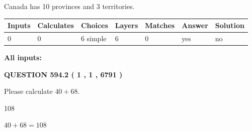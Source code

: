 \documentclass[12pt]{article}
\begin{document}
 
Canada has 10  provinces and 3 territories.
 
 
\noindent{}
 
 
   
   
   
   
\noindent\begin{tabular}{|l|l|l|l|l|l|l|}
 \hline
Inputs & Calculates & Choices & Layers & Matches & Answer & Solution \\ \hline
 0  & 
 0  & 
 6
  simple  
  & 
 6  & 
 0  & 
  yes & 
  no 
  \\ \hline
 \end{tabular}
   
   
   
   
\noindent{}
   
   
   
   
\noindent\vspace{0.1in}\hspace{-0.08in} {\textbf{\Large{All inputs: }}}
   
   
  
\vspace{0.2in}
  
{\textbf{\Large{QUESTION
594.2 
 ( 1 , 1 , 6791 )
}}}
  
  
 
Please calculate $ %
40 +  %
68 $.
 
 
 
\noindent{}
 
 

108
 
 
\noindent{}
 
 

 
 
 
\noindent{}
 
 

$ %
40 +  %
68=   %
108$
 
 
\noindent{}
 
 

 
   
\end{document}

